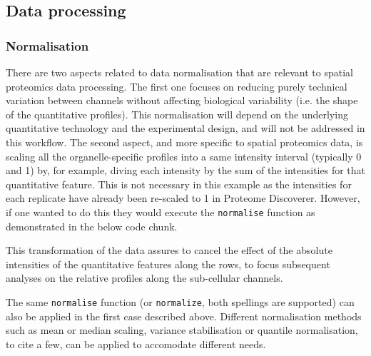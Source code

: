 \subsection*{Data processing}

\subsubsection*{Normalisation}

There are two aspects related to data normalisation that are relevant
to spatial proteomics data processing. The first one focuses on
reducing purely technical variation between channels without
affecting biological variability (i.e. the shape of the quantitative
profiles). This normalisation will depend on the underlying
quantitative technology and the experimental design, and will not be
addressed in this workflow. The second aspect, and more specific to
spatial proteomics data, is scaling all the organelle-specific
profiles into a same intensity interval (typically 0 and 1) by, for
example, diving each intensity by the sum of the intensities for that
quantitative feature. This is not necessary in this example as the
intensities for each replicate have already been re-scaled to 1 in
Proteome Discoverer. However, if one wanted to do this they would
execute the \texttt{normalise} function as demonstrated in the below code
chunk.

\begin{knitrout}
\color{fgcolor}\begin{kframe}
\begin{alltt}
 \hlkwb{<-}   \hlstd{=} \hlstd{)}
\end{alltt}
\end{kframe}
\end{knitrout}

This transformation of the data assures to cancel the effect of the
absolute intensities of the quantitative features along the rows, to
focus subsequent analyses on the relative profiles along the
sub-cellular channels.

The same \texttt{normalise} function (or \texttt{normalize}, both spellings are
supported) can also be applied in the first case described above.
Different normalisation methods such as mean or median scaling,
variance stabilisation or quantile normalisation, to cite a few, can
be applied to accomodate different needs.

